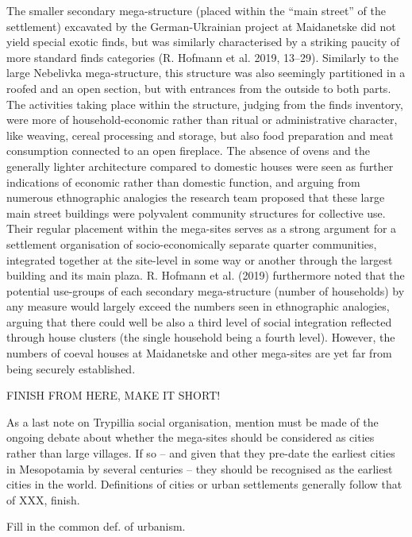 \documentclass[
  12pt,
  a4paper, twoside]{book}
\begin{document}
The smaller secondary mega-structure (placed within the ``main street'' of the settlement) excavated by the German-Ukrainian project at Maidanetske did not yield special exotic finds, but was similarly characterised by a striking paucity of more standard finds categories (R. Hofmann et al. 2019, 13--29). Similarly to the large Nebelivka mega-structure, this structure was also seemingly partitioned in a roofed and an open section, but with entrances from the outside to both parts. The activities taking place within the structure, judging from the finds inventory, were more of household-economic rather than ritual or administrative character, like weaving, cereal processing and storage, but also food preparation and meat consumption connected to an open fireplace. The absence of ovens and the generally lighter architecture compared to domestic houses were seen as further indications of economic rather than domestic function, and arguing from numerous ethnographic analogies the research team proposed that these large main street buildings were polyvalent community structures for collective use. Their regular placement within the mega-sites serves as a strong argument for a settlement organisation of socio-economically separate quarter communities, integrated together at the site-level in some way or another through the largest building and its main plaza. R. Hofmann et al. (2019) furthermore noted that the potential use-groups of each secondary mega-structure (number of households) by any measure would largely exceed the numbers seen in ethnographic analogies, arguing that there could well be also a third level of social integration reflected through house clusters (the single household being a fourth level). However, the numbers of coeval houses at Maidanetske and other mega-sites are yet far from being securely established.

FINISH FROM HERE, MAKE IT SHORT!

As a last note on Trypillia social organisation, mention must be made of the ongoing debate about whether the mega-sites should be considered as cities rather than large villages. If so -- and given that they pre-date the earliest cities in Mesopotamia by several centuries -- they should be recognised as the earliest cities in the world. Definitions of cities or urban settlements generally follow that of XXX, finish.

Fill in the common def. of urbanism.
\end{document}

